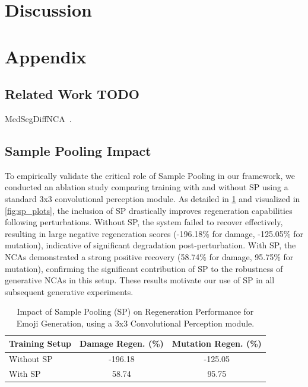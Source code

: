 \documentclass[10pt]{article} %
\begin{document}
\section{Discussion}






\appendix
\section{Appendix}

\subsection{Related Work TODO}
\label{app:related_work}

MedSegDiffNCA~\cite{mittal2025medsegdiffncadiffusionmodelsneural}.


\subsection{Sample Pooling Impact}
\label{c:sample_pool}
To empirically validate the critical role of Sample Pooling in our framework, we conducted an ablation study comparing training with and without SP using a standard 3x3 convolutional perception module. As detailed in \cref{tab:sp_regen} and visualized in \cref{fig:sp_plots}, the inclusion of SP drastically improves regeneration capabilities following perturbations. Without SP, the system failed to recover effectively, resulting in large negative regeneration scores (-196.18\% for damage, -125.05\% for mutation), indicative of significant degradation post-perturbation. With SP, the NCAs demonstrated a strong positive recovery (58.74\% for damage, 95.75\% for mutation), confirming the significant contribution of SP to the robustness of generative NCAs in this setup. These results motivate our use of SP in all subsequent generative experiments.

\begin{table}[htbp]
\centering
\caption{Impact of Sample Pooling (SP) on Regeneration Performance for Emoji Generation, using a 3x3 Convolutional Perception module.}
\label{tab:sp_regen}
\begin{tabular}{lcc}
\hline
\textbf{Training Setup} & \textbf{Damage Regen. (\%)} & \textbf{Mutation Regen. (\%)} \\ \hline
Without SP & -196.18 & -125.05 \\
With SP    &   58.74 &   95.75 \\
\hline
\end{tabular}
\end{table}
\end{document}
